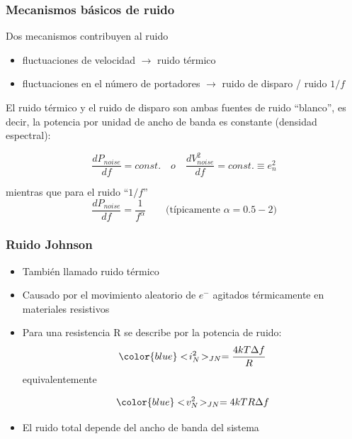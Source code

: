 \documentclass{beamer}
\begin{document}
\begin{frame}
\frametitle{Mecanismos básicos de ruido}
{\color{blue}Dos mecanismos contribuyen al ruido}
\begin{itemize}
\item fluctuaciones de velocidad $\rightarrow$ {\color[rgb]{0.8,0.33,0}ruido térmico}
\item fluctuaciones en el número de portadores $\rightarrow$
{\color[rgb]{0.43,0.21,0.1}ruido de disparo / ruido
$1/f$}
\end{itemize}
El ruido térmico y el ruido de disparo son ambas fuentes de ruido ``blanco'', es
decir, la potencia por unidad de ancho de banda es constante (\alert{densidad
espectral}):

$$\frac{dP_{noise}}{df} = const. \quad o
\quad \frac{dV_{noise}^2}{df} = const. \equiv
e_n^2$$

mientras que para el ruido ``$1/f$''
$$\frac{dP_{noise}}{df} =
\frac{1}{f^\alpha} \qquad \text{(típicamente $\alpha = 0.5 - 2$)}$$
\end{frame} 

\begin{frame}
\frametitle{Ruido Johnson}
\begin{alertblock}{}
\begin{itemize}
\item También llamado ruido térmico
\item Causado por el movimiento aleatorio de $e^-$ agitados térmicamente en
materiales resistivos
\item Para una resistencia R se describe por la potencia de ruido:
$${\color{blue}<\!i_N^2\!>_{JN} = \frac{4kT\Delta f}{R}}$$
equivalentemente

$${\color{blue}<\!v_N^2\!>_{JN} = 4kTR\Delta f}$$
\item \alert{El ruido total depende del ancho de banda del sistema}
\end{itemize}
\end{alertblock}
\end{frame} 
\end{document}

